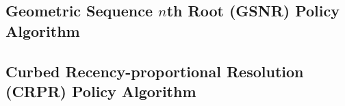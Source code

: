 



% 

\subsection{Geometric Sequence $n$th Root (GSNR) Policy Algorithm}




% 
% 

\subsection{Curbed Recency-proportional Resolution (CRPR) Policy Algorithm}

% 


% 
% 
